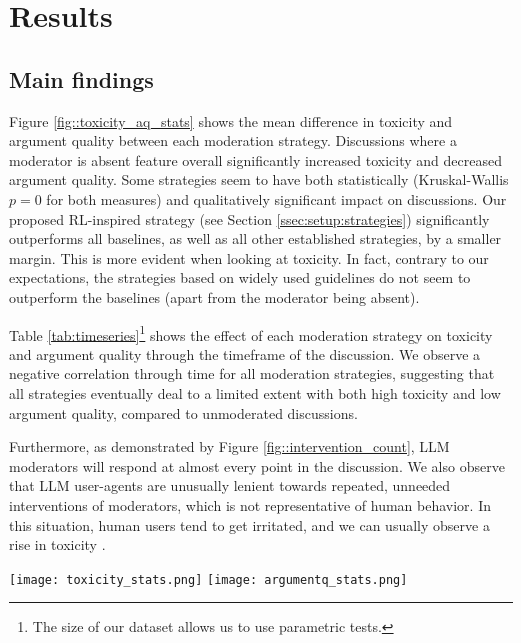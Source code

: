 %

\section{Results}

\subsection{Main findings}

Figure \ref{fig::toxicity_aq_stats} shows the mean difference in toxicity and argument quality between each moderation strategy. Discussions where a moderator is absent feature overall significantly increased toxicity and decreased argument quality. Some strategies seem to have both statistically (Kruskal-Wallis $p=0$ for both measures) and qualitatively significant impact on discussions. Our proposed \ac{RL}-inspired strategy (see Section \ref{ssec:setup:strategies}) significantly outperforms all baselines, as well as all other established strategies, by a smaller margin. This is more evident when looking at toxicity. In fact, contrary to our expectations, the strategies based on widely used guidelines do not seem to outperform the baselines (apart from the moderator being absent).

Table \ref{tab:timeseries}\footnote{The size of our dataset allows us to use parametric tests.} shows the effect of each moderation strategy on toxicity and argument quality through the timeframe of the discussion. We observe a negative correlation through time for all moderation strategies, suggesting that all strategies eventually deal to a limited extent with both high toxicity and low argument quality, compared to unmoderated discussions.

Furthermore, as demonstrated by Figure \ref{fig::intervention_count}, \ac{LLM} moderators will respond at almost every point in the discussion. We also observe that \ac{LLM} user-agents are unusually lenient towards repeated, unneeded interventions of moderators, which is not representative of human behavior. In this situation, human users tend to get irritated, and we can usually observe a rise in toxicity \cite{schaffner_community_guidelines, make_reddit_great, proactive_moderation, cresci_pesonalized_interventions}.

\begin{figure*}[t]
    \texttt{[image: toxicity\_stats.png]} \hfill
    \texttt{[image: argumentq\_stats.png]}
	\centering
	\caption{Mean difference of Toxicity (left) and Argument Quality (right) between each moderation strategy. $A[i, j] = 0.3^{***}$ indicates that the strategy $j$ is better than the strategy $i$ for an average of $0.3$ points with $p<0.001$. Each comparison is accompanied by Dunn's posthoc test for multiple comparisons \cite{dunn}, in the form of significance asterisks.}
	\label{fig::toxicity_aq_stats}
\end{figure*}

